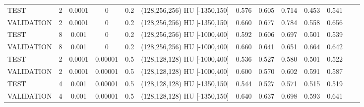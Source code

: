 \begin{table}[!htbp]
{\begin{tabular}{lcccccccccccc}
TEST & 2 & 0.0001 & 0 & 0.2 & (128,256,256) HU [-1350,150] & 0.576 & 0.605 & 0.714 & 0.453 & 0.541 \\
VALIDATION & 2 & 0.0001 & 0 & 0.2 & (128,256,256) HU [-1350,150] & 0.660 & 0.677 & 0.784 & 0.558 & 0.656 \\
\midrule
TEST & 8 & 0.001 & 0 & 0.2 & (128,256,256) HU [-1000,400] & 0.592 & 0.606 & 0.697 & 0.501 & 0.539 \\
VALIDATION & 8 & 0.001 & 0 & 0.2 & (128,256,256) HU [-1000,400] & 0.660 & 0.641 & 0.651 & 0.664 & 0.642 \\

\midrule
TEST & 2 & 0.0001 & 0.00001 & 0.5 & (128,128,128) HU [-1000,400] & 0.536 & 0.527 & 0.580 & 0.501 & 0.522 \\
VALIDATION & 2 & 0.0001 & 0.00001 & 0.5 & (128,128,128) HU [-1000,400] & 0.600 & 0.570 & 0.602 & 0.591 & 0.587 \\
\midrule
TEST & 4 & 0.001 & 0.00001 & 0.5 & (128,128,128) HU [-1350,150] & 0.544 & 0.527 & 0.571 & 0.515 & 0.519 \\
VALIDATION & 4 & 0.001 & 0.00001 & 0.5 & (128,128,128) HU [-1350,150] & 0.640 & 0.637 & 0.698 & 0.593 & 0.641 \\
\bottomrule
\end{tabular}%
}
\end{table}




